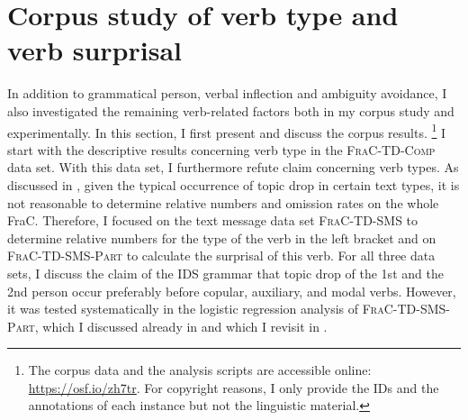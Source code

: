 \section{Corpus study of verb type and verb surprisal}
In addition to grammatical person, verbal inflection and ambiguity avoidance, I also investigated the remaining verb-related factors both in my corpus study and experimentally.
In this section, I first present and discuss the corpus results.%
\footnote{The corpus data and the analysis scripts are accessible online: \url{https://osf.io/zh7tr}.
For copyright reasons, I only provide the IDs and the annotations of each instance but not the linguistic material.}
%
I start with the descriptive results concerning verb type in the \textsc{FraC-TD-Comp} data set.
With this data set, I furthermore refute  claim concerning verb types.
As discussed in , given the typical occurrence of topic drop in certain text types, it is not reasonable to determine relative numbers and omission rates on the whole FraC.
Therefore, I focused on the text message data set \textsc{FraC-TD-SMS} to determine relative numbers for the type of the verb in the left bracket and on \textsc{FraC-TD-SMS-Part}  to calculate the surprisal of this verb.
For all three data sets, I discuss the claim of the IDS grammar \citep{zifonun.etal1997} that topic drop of the 1st and the 2nd person occur preferably before copular, auxiliary, and modal verbs.
However, it was tested systematically in the  logistic regression analysis of \textsc{FraC-TD-SMS-Part}, which I discussed already in  and which I revisit in .

